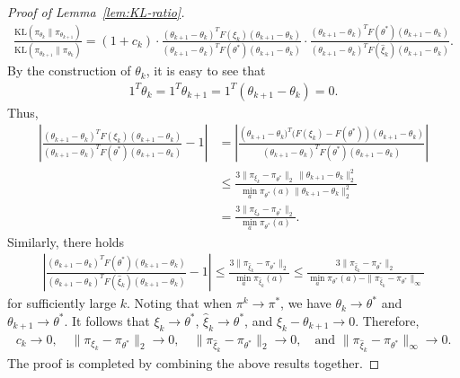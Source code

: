 \begin{proof}[Proof of Lemma~\ref{lem:KL-ratio}]
\begin{align*}
        \frac{\mathrm{KL}(\pi_{\theta_k}\|\pi_{\theta_{k+1}})}
        {\mathrm{KL}(\pi_{\theta_{k+1}}\|\pi_{\theta_{k}})}=(1+c_k) \cdot 
        \frac{(\theta_{k+1}-\theta_k)^TF(\xi_k)(\theta_{k+1}-\theta_k)} 
        {(\theta_{k+1}-\theta_k)^TF(\theta^*)(\theta_{k+1}-\theta_k)}
        \cdot
        \frac{(\theta_{k+1}-\theta_k)^TF(\theta^*)(\theta_{k+1}-\theta_k)}{(\theta_{k+1}-\theta_k)^TF(\hat{\xi}_k)(\theta_{k+1}-\theta_k)}.
    \end{align*}   
    By the construction of $\theta_k$, it is easy to see that
    \begin{align*}
        1^T\theta_k = 1^T\theta_{k+1} = 1^T(\theta_{k+1}-\theta_k)=0.
    \end{align*}
    Thus,
    \begin{align*}
        \left|\frac{(\theta_{k+1}-\theta_k)^TF(\xi_k)(\theta_{k+1}-\theta_k)}{(\theta_{k+1}-\theta_k)^TF(\theta^*)(\theta_{k+1}-\theta_k)}-1\right|&=\left|\frac{\left(\theta_{k+1}-\theta_k)^T(F(\xi_k)-F(\theta^*)\right)(\theta_{k+1}-\theta_k)}{(\theta_{k+1}-\theta_k)^TF(\theta^*)(\theta_{k+1}-\theta_k)}\right|\\
        &\leq \frac{3\|\pi_{\xi_k}-\pi_{\theta^*}\|_2\,\|\theta_{k+1}-\theta_k\|_2^2}{\min_a\pi_{\theta^*}(a)\,\|\theta_{k+1}-\theta_k\|_2^2}\\
        &=\frac{3\|\pi_{\xi_k}-\pi_{\theta^*}\|_2}{\min_a\pi_{\theta^*}(a)}.
    \end{align*}
    Similarly, there holds
    \begin{align*}
        \left|\frac{(\theta_{k+1}-\theta_k)^TF(\theta^*)(\theta_{k+1}-\theta_k)}{(\theta_{k+1}-\theta_k)^TF(\hat{\xi}_k)(\theta_{k+1}-\theta_k)} - 1\right|\leq \frac{3\|\pi_{\hat{\xi}_k}-\pi_{\theta^*}\|_2}{\min_a\pi_{\hat{\xi}_k}(a)}\leq\frac{3\|\pi_{\hat{\xi}_k}-\pi_{\theta^*}\|_2}{\min_a\pi_{\theta^*}(a)-\|\pi_{\hat{\xi}_k}-\pi_{\theta^*}\|_\infty}
    \end{align*}
    for sufficiently large $k$. Noting that when $\pi^k\rightarrow \pi^*$, we have $\theta_k\rightarrow \theta^*$ and $\theta_{k+1}\rightarrow \theta^*$. It follows that $\xi_k\rightarrow \theta^*$, $\hat{\xi}_k\rightarrow\theta^*$, and $\xi_k-\theta_{k+1}\rightarrow 0$. Therefore,
    \begin{align*}
        c_k\rightarrow 0, \quad \|\pi_{\xi_k}-\pi_{\theta^*}\|_2\rightarrow 0,\quad \|\pi_{\hat{\xi}_k}-\pi_{\theta^*}\|_2\rightarrow 0,\quad\mbox{and  }\|\pi_{\hat{\xi}_k}-\pi_{\theta^*}\|_\infty\rightarrow 0.
    \end{align*}    
    The proof is completed by combining the above results together.
\end{proof}
